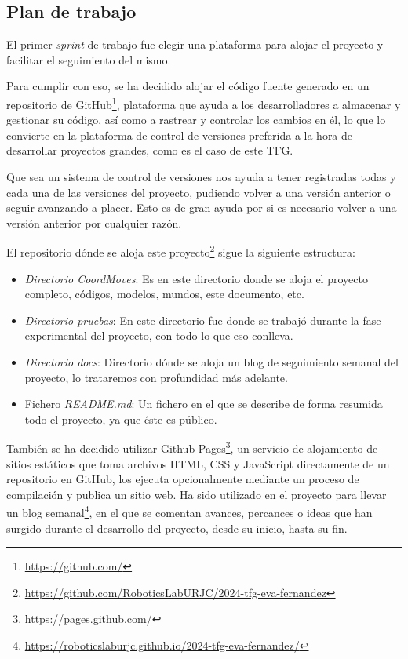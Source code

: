 \subsection{Plan de trabajo}

El primer \textit{sprint} de trabajo fue elegir una plataforma para alojar el proyecto y facilitar el seguimiento del mismo.

Para cumplir con eso, se ha decidido alojar el código fuente generado en un repositorio de GitHub\footnote{\url{https://github.com/}}, plataforma que ayuda a los desarrolladores a almacenar y gestionar su código, así como a rastrear y controlar los cambios en él, lo que lo convierte en la plataforma de control de versiones preferida a la hora de desarrollar proyectos grandes, como es el caso de este TFG.

Que sea un sistema de control de versiones nos ayuda a tener registradas todas y cada una de las versiones del proyecto, pudiendo volver a una versión anterior o seguir avanzando a placer. Esto es de gran ayuda por si es necesario volver a una versión anterior por cualquier razón.

El repositorio dónde se aloja este proyecto\footnote{\url{https://github.com/RoboticsLabURJC/2024-tfg-eva-fernandez}} sigue la siguiente estructura:

\begin{itemize}
    \item \textit{Directorio CoordMoves}: Es en este directorio donde se aloja el proyecto completo, códigos, modelos, mundos, este documento, etc.
    \item \textit{Directorio pruebas}: En este directorio fue donde se trabajó durante la fase experimental del proyecto, con todo lo que eso conlleva. 
    \item \textit{Directorio docs}: Directorio dónde se aloja un blog de seguimiento semanal del proyecto, lo trataremos con profundidad más adelante.
    \item Fichero \textit{README.md}: Un fichero en el que se describe de forma resumida todo el proyecto, ya que éste es público.
\end{itemize}

También se ha decidido utilizar Github Pages\footnote{\url{https://pages.github.com/}}, un servicio de alojamiento de sitios estáticos que toma archivos HTML, CSS y JavaScript directamente de un repositorio en GitHub, los ejecuta opcionalmente mediante un proceso de compilación y publica un sitio web. Ha sido utilizado en el proyecto para llevar un blog semanal\footnote{\url{https://roboticslaburjc.github.io/2024-tfg-eva-fernandez/}}, en el que se comentan avances, percances o ideas que han surgido durante el desarrollo del proyecto, desde su inicio, hasta su fin.

